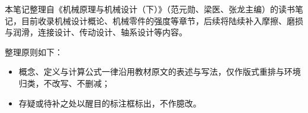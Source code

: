 本笔记整理自《机械原理与机械设计（下）》（范元勋、梁医、张龙主编）的读书笔记，目前收录机械设计概论、机械零件的强度等章节，后续将陆续补入摩擦、磨损与润滑，连接设计、传动设计、轴系设计等内容。

整理原则如下：

\begin{itemize}
	\item 概念、定义与计算公式一律沿用教材原文的表述与写法，仅作版式重排与环境归类，不改写、不删减；
	\item 存疑或待补之处以醒目的标注框标出，不作臆改。
\end{itemize}

